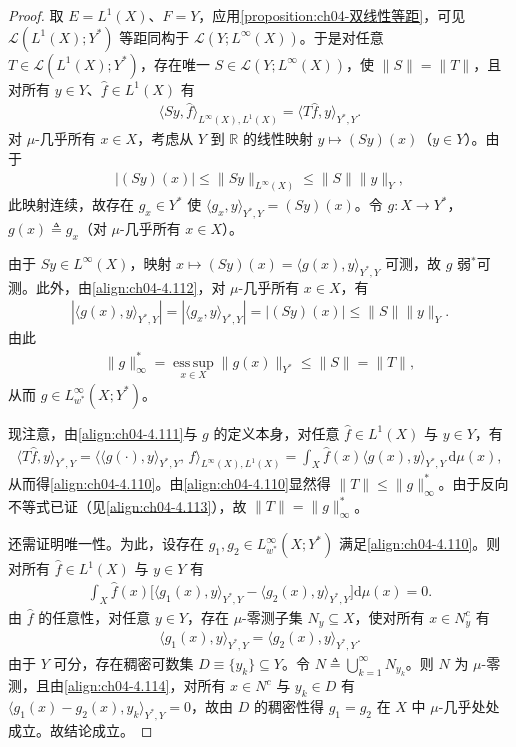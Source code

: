 \documentclass[../../main.tex]{subfiles}%
\begin{document}
\begin{proof}
取 $E=L^1(X)$、$F=Y$，应用\cref{proposition:ch04-双线性等距}，可见 $\mathcal{L}(L^1(X);Y^*)$ 等距同构于 $\mathcal{L}(Y;L^\infty(X))$。于是对任意 $T\in\mathcal{L}(L^1(X);Y^*)$，存在唯一 $S\in\mathcal{L}(Y;L^\infty(X))$，使 $\|S\|=\|T\|$，且对所有 $y\in Y$、$\hat f\in L^1(X)$ 有
\begin{align}
\langle Sy,\hat f\rangle_{L^\infty(X),L^1(X)}=\langle T\hat f,y\rangle_{Y^*,Y}. \label{align:ch04-4.111}
\end{align}
对 $\mu$-几乎所有 $x\in X$，考虑从 $Y$ 到 $\mathbb{R}$ 的线性映射 $y\mapsto(Sy)(x)$（$y\in Y$）。由于
\begin{align}
|(Sy)(x)|\leqslant\|Sy\|_{L^\infty(X)}\leqslant\|S\|\|y\|_Y, \label{align:ch04-4.112}
\end{align}
此映射连续，故存在 $g_x\in Y^*$ 使 $\langle g_x,y\rangle_{Y^*,Y}=(Sy)(x)$。令 $g:X\to Y^*$，$g(x)\triangleq g_x$（对 $\mu$-几乎所有 $x\in X$）。

由于 $Sy\in L^\infty(X)$，映射 $x\mapsto(Sy)(x)=\langle g(x),y\rangle_{Y^*,Y}$ 可测，故 $g$ 弱$^*$可测。此外，由\eqref{align:ch04-4.112}，对 $\mu$-几乎所有 $x\in X$，有
\begin{align*}
|\langle g(x),y\rangle_{Y^*,Y}|=|\langle g_x,y\rangle_{Y^*,Y}|=|(Sy)(x)|\leqslant\|S\|\|y\|_Y.
\end{align*}
由此
\begin{align}
\|g\|_\infty^*=\operatorname*{ess\,sup}_{x\in X}\|g(x)\|_{Y^*}\leqslant\|S\|=\|T\|, \label{align:ch04-4.113}
\end{align}
从而 $g\in L^\infty_{w^*}(X;Y^*)$。

现注意，由\eqref{align:ch04-4.111}与 $g$ 的定义本身，对任意 $\hat f\in L^1(X)$ 与 $y\in Y$，有
\begin{align*}
\langle T\hat f,y\rangle_{Y^*,Y}=\big\langle\langle g(\cdot),y\rangle_{Y^*,Y},\,\hat f\big\rangle_{L^\infty(X),L^1(X)}
=\int_X\hat f(x)\langle g(x),y\rangle_{Y^*,Y}\,\mathrm{d}\mu(x),
\end{align*}
从而得\eqref{align:ch04-4.110}。由\eqref{align:ch04-4.110}显然得 $\|T\|\leqslant\|g\|_\infty^*$。由于反向不等式已证（见\eqref{align:ch04-4.113}），故 $\|T\|=\|g\|_\infty^*$。

还需证明唯一性。为此，设存在 $g_1,g_2\in L^\infty_{w^*}(X;Y^*)$ 满足\eqref{align:ch04-4.110}。则对所有 $\hat f\in L^1(X)$ 与 $y\in Y$ 有
\begin{align*}
\int_X\hat f(x)\big[\langle g_1(x),y\rangle_{Y^*,Y}-\langle g_2(x),y\rangle_{Y^*,Y}\big]\mathrm{d}\mu(x)=0.
\end{align*}
由 $\hat f$ 的任意性，对任意 $y\in Y$，存在 $\mu$-零测子集 $N_y\subseteq X$，使对所有 $x\in N_y^c$ 有
\begin{align}
\langle g_1(x),y\rangle_{Y^*,Y}=\langle g_2(x),y\rangle_{Y^*,Y}. \label{align:ch04-4.114}
\end{align}
由于 $Y$ 可分，存在稠密可数集 $D\equiv\{y_k\}\subseteq Y$。令 $N\triangleq \bigcup_{k=1}^\infty N_{y_k}$。则 $N$ 为 $\mu$-零测，且由\eqref{align:ch04-4.114}，对所有 $x\in N^c$ 与 $y_k\in D$ 有 $\langle g_1(x)-g_2(x),y_k\rangle_{Y^*,Y}=0$，故由 $D$ 的稠密性得 $g_1=g_2$ 在 $X$ 中 $\mu$-几乎处处成立。故结论成立。
\end{proof}
\end{document}
